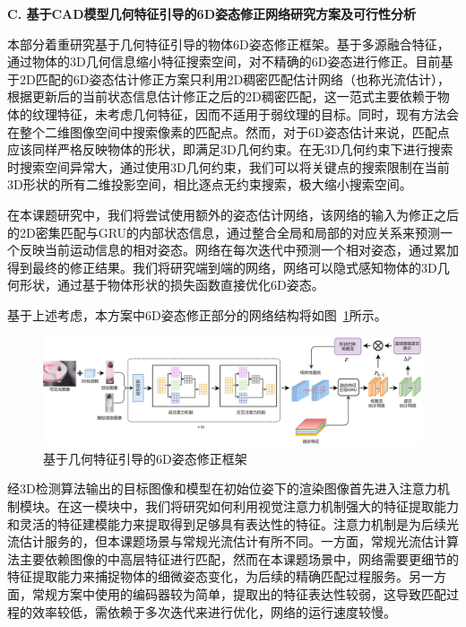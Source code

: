 \documentclass[12pt]{article}
\begin{document}
\textbf{C. 基于CAD模型几何特征引导的6D姿态修正网络研究方案及可行性分析}

本部分着重研究基于几何特征引导的物体6D姿态修正框架。基于多源融合特征，通过物体的3D几何信息缩小特征搜索空间，对不精确的6D姿态进行修正。目前基于2D匹配的6D姿态估计修正方案只利用2D稠密匹配估计网络（也称光流估计），根据更新后的当前状态信息估计修正之后的2D稠密匹配，这一范式主要依赖于物体的纹理特征，未考虑几何特征，因而不适用于弱纹理的目标。同时，现有方法会在整个二维图像空间中搜索像素的匹配点。然而，对于6D姿态估计来说，匹配点应该同样严格反映物体的形状，即满足3D几何约束。在无3D几何约束下进行搜索时搜索空间异常大，通过使用3D几何约束，我们可以将关键点的搜索限制在当前3D形状的所有二维投影空间，相比逐点无约束搜索，极大缩小搜索空间。

在本课题研究中，我们将尝试使用额外的姿态估计网络，该网络的输入为修正之后的2D密集匹配与GRU的内部状态信息，通过整合全局和局部的对应关系来预测一个反映当前运动信息的相对姿态。网络在每次迭代中预测一个相对姿态，通过累加得到最终的修正结果。我们将研究端到端的网络，网络可以隐式感知物体的3D几何形状，通过基于物体形状的损失函数直接优化6D姿态。

基于上述考虑，本方案中6D姿态修正部分的网络结构将如图~\ref{fig:geo_guided_6D_refine}所示。

\begin{figure}[h]
    \centering
    \includegraphics[width=\linewidth]{geo_guided_6d_refine.jpg}
    \caption{基于几何特征引导的6D姿态修正框架}
    \label{fig:geo_guided_6D_refine}
\end{figure}
经3D检测算法输出的目标图像和模型在初始位姿下的渲染图像首先进入注意力机制模块。在这一模块中，我们将研究如何利用视觉注意力机制强大的特征提取能力和灵活的特征建模能力来提取得到足够具有表达性的特征。注意力机制是为后续光流估计服务的，但本课题场景与常规光流估计有所不同。一方面，常规光流估计算法主要依赖图像的中高层特征进行匹配，然而在本课题场景中，网络需要更细节的特征提取能力来捕捉物体的细微姿态变化，为后续的精确匹配过程服务。另一方面，常规方案中使用的编码器较为简单，提取出的特征表达性较弱，这导致匹配过程的效率较低，需依赖于多次迭代来进行优化，网络的运行速度较慢。
\end{document}
